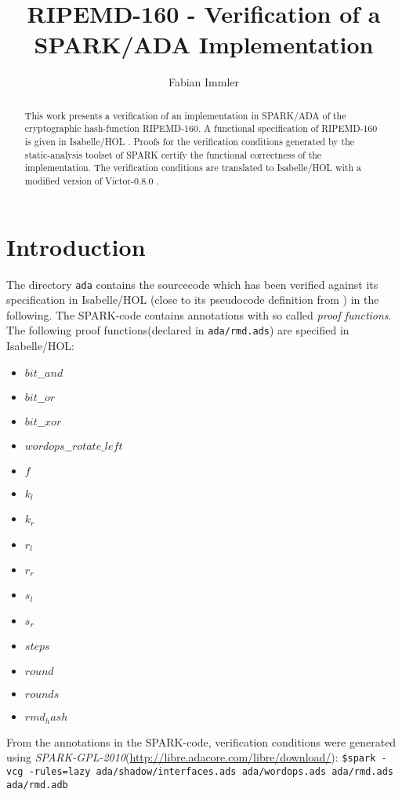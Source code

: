 \documentclass[11pt,a4paper]{article}
\begin{document}
\title{RIPEMD-160 - Verification of a SPARK/ADA Implementation}
\author{Fabian Immler}
\maketitle

\begin{abstract}
This work presents a verification of an implementation in SPARK/ADA \cite{highintegritysoftware} of the cryptographic hash-function RIPEMD-160. A functional specification of RIPEMD-160 \cite{ripemd} is given in Isabelle/HOL \cite{LNCS2283}. Proofs for the verification conditions generated by the static-analysis toolset of SPARK certify the functional correctness of the implementation. The verification conditions are translated to Isabelle/HOL with a modified version of Victor-0.8.0 \cite{vct}.
\end{abstract}

\tableofcontents

\section{Introduction}

The directory \texttt{ada} contains the sourcecode which has been verified
against its specification in Isabelle/HOL (close to its pseudocode definition
from \cite{ripemd}) in the following.  The SPARK-code contains annotations with
so called \emph{proof functions}. The following proof functions(declared in
\texttt{ada/rmd.ads}) are specified in Isabelle/HOL:
\begin{itemize}
\item $bit\_\_and$
\item $bit\_\_or$
\item $bit\_\_xor$
\item $wordops\_\_rotate\_left$
\item $f$
\item $k_l$
\item $k_r$
\item $r_l$
\item $r_r$
\item $s_l$
\item $s_r$
\item $steps$
\item $round$
\item $rounds$
\item $rmd_hash$
\end{itemize}

From the annotations in the SPARK-code, verification conditions were generated
using \emph{SPARK-GPL-2010}(\url{http://libre.adacore.com/libre/download/}):
\texttt{\$spark -vcg -rules=lazy ada/shadow/interfaces.ads ada/wordops.ads
  ada/rmd.ads ada/rmd.adb}
\end{document}
